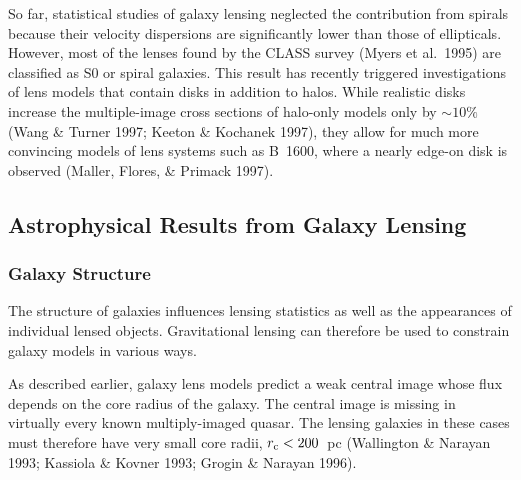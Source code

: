 \documentclass[a4paper,10pt]{article} %
\begin{document}
So far, statistical studies of galaxy lensing neglected the
contribution from spirals because their velocity dispersions are
significantly lower than those of ellipticals. However, most of the
lenses found by the CLASS survey (Myers et al.\ 1995) are classified
as S0 or spiral galaxies. This result has recently triggered
investigations of lens models that contain disks in addition to
halos. While realistic disks increase the multiple-image cross
sections of halo-only models only by $\sim10\%$ (Wang \& Turner 1997;
Keeton \& Kochanek 1997), they allow for much more convincing models
of lens systems such as B~1600, where a nearly edge-on disk is
observed (Maller, Flores, \& Primack 1997).

\subsection{Astrophysical Results from Galaxy Lensing}
\label{NB:subsect3.7}

\subsubsection{Galaxy Structure}
\label{NB:subsubsect3.7.1}

The structure of galaxies influences lensing statistics as well as the
appearances of individual lensed objects. Gravitational lensing can
therefore be used to constrain galaxy models in various ways.

As described earlier, galaxy lens models predict a weak central image
whose flux depends on the core radius of the galaxy. The central image
is missing in virtually every known multiply-imaged quasar. The
lensing galaxies in these cases must therefore have very small core
radii, $r_{\rm c}<200$~pc (Wallington \& Narayan 1993; Kassiola \&
Kovner 1993; Grogin \& Narayan 1996).
\end{document}
